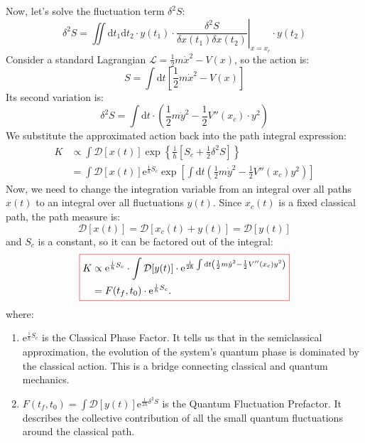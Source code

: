 Now, let's solve the fluctuation term $\delta^2 S$:
\begin{equation}
\delta^2 S = \iint \mathrm{d}t_1 \mathrm{d}t_2 \cdot y(t_1) \cdot \left.\frac{\delta^2 S}{\delta x(t_1) \delta x(t_2)}\right|_{x=x_c} \cdot y(t_2)
\end{equation}
Consider a standard Lagrangian $\mathcal{L} = \frac{1}{2}m\dot{x}^2 - V(x)$, so the action is:
\begin{equation}
S = \int \mathrm{d}t \left[\frac{1}{2}m\dot{x}^2 - V(x)\right]
\end{equation}
Its second variation is:
\begin{equation}
\delta^2 S = \int \mathrm{d}t \cdot \left(\frac{1}{2}m\dot{y}^2 - \frac{1}{2}V''(x_c) \cdot y^2\right)
\end{equation}
We substitute the approximated action back into the path integral expression:
\begin{equation}
\begin{aligned}
K &\propto \int \mathcal{D}[x(t)] \exp\left\{\frac{\mathrm{i}}{\hbar}\left[S_c + \frac{1}{2}\delta^2 S\right]\right\} \\
&= \int \mathcal{D}[x(t)] \mathrm{e}^{\frac{\mathrm{i}}{\hbar}S_c} \exp\left[\int \mathrm{d}t \left(\frac{1}{2}m\dot{y}^2 - \frac{1}{2}V''(x_c)y^2\right)\right]
\end{aligned}
\end{equation}
Now, we need to change the integration variable from an integral over all paths $x(t)$ to an integral over all fluctuations $y(t)$. 
Since $x_c(t)$ is a fixed classical path, the path measure is:
\begin{equation}
\mathcal{D}[x(t)] = \mathcal{D}[x_c(t)+y(t)] = \mathcal{D}[y(t)]
\end{equation}
and $S_c$ is a constant, so it can be factored out of the integral:
\begin{equation}
    \colorboxed{
    \begin{aligned}
    K &\propto \mathrm{e}^{\frac{\mathrm{i}}{\hbar}S_c} \cdot \int \mathcal{D}[y(t)] \cdot \mathrm{e}^{\frac{\mathrm{i}}{2\hbar} \int \mathrm{d}t \left(\frac{1}{2}m\dot{y}^2 - \frac{1}{2}V''(x_c)y^2\right)} \\
    &= F(t_f, t_0) \cdot \mathrm{e}^{\frac{\mathrm{i}}{\hbar}S_c}.
    \end{aligned}
    }
\end{equation}
where:
\begin{enumerate}
    \item $\mathrm{e}^{\frac{\mathrm{i}}{\hbar}S_c}$ is the Classical Phase Factor. It tells us that in the semiclassical approximation, the evolution of the system's quantum phase is dominated by the classical action. This is a bridge connecting classical and quantum mechanics.
    \item $F(t_f, t_0) = \int \mathcal{D}[y(t)] \mathrm{e}^{\frac{\mathrm{i}}{2\hbar}\delta^2 S}$ is the Quantum Fluctuation Prefactor. It describes the collective contribution of all the small quantum fluctuations around the classical path.
\end{enumerate}
